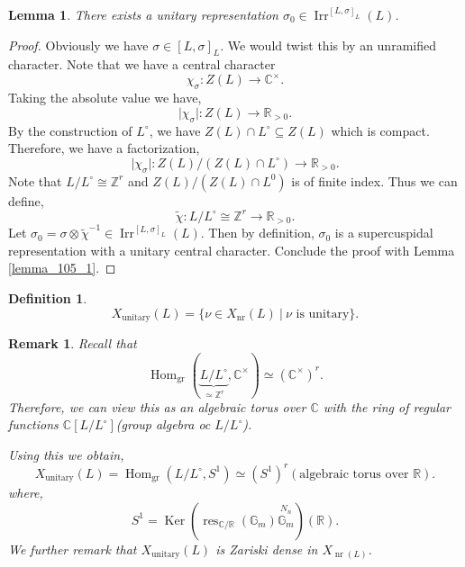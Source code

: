 \documentclass[8pt]{article}
\newtheorem{definition}{Definition}[section]
\newtheorem{lemma}{Lemma}[section]
\newtheorem{remark}{Remark}[section]
\DeclareMathOperator{\unitary}{unitary}
\DeclareMathOperator{\Hom}{Hom}
\DeclareMathOperator{\Ker}{Ker}
\DeclareMathOperator{\gr}{gr}
\DeclareMathOperator{\Irr}{Irr}
\DeclareMathOperator{\nr}{nr}
\DeclareMathOperator{\res}{res}
\newcommand{\R}[0]{\mathbb{R}}
\newcommand{\Z}[0]{\mathbb{Z}}
\newcommand{\C}[0]{\mathbb{C}}
\newcommand{\G}[0]{\mathbb{G}}
\newcommand{\sep}[0]{\:|\:}
\begin{document}
\begin{lemma}
  \label{lemma_105}
  There exists a unitary representation $\sigma_0\in\Irr^{[L,\sigma]_L}(L)$.
\end{lemma}
\begin{proof}
  Obviously we have $\sigma\in [L,\sigma]_L$. We would twist this by an unramified character. Note that we have a central character 
  \begin{equation*}
    \chi_{\sigma}:Z(L)\to\C^\times.
  \end{equation*}
  Taking the absolute value we have,
  \begin{equation*}
    \vert\chi_{\sigma}\vert:Z(L)\to\R_{>0}.
  \end{equation*}
  By the construction of $L^\circ$, we have $Z(L)\cap L^\circ\subseteq Z(L)$ which is compact. Therefore, we have a factorization,
  \begin{equation*}
    \vert \chi_{\sigma}\vert:Z(L)/(Z(L)\cap L^\circ)\to\R_{>0}.
  \end{equation*}
  Note that $L/L^\circ \cong \Z^r$ and $Z(L)/(Z(L)\cap L^0)$ is of finite index. Thus we can define,
  \begin{equation*}
    \widetilde{\chi}:L/L^\circ\cong\Z^r\to\R_{>0}.
  \end{equation*}
  Let $\sigma_0 = \sigma\otimes \widetilde{\chi}^{-1}\in\Irr^{[L,\sigma]_L}(L)$. Then by definition, $\sigma_0$ is a supercuspidal representation with a unitary central character.
  Conclude the proof with Lemma \ref{lemma_105_1}.
\end{proof}
\begin{definition}
  \begin{equation*}
    X_{\text{unitary}}(L) = \{\nu\in X_{\nr}(L)\sep \text{$\nu$ is unitary}\}.
  \end{equation*}
\end{definition}
\begin{remark}
  Recall that 
  \begin{equation*}
    \Hom_{\gr}(\underbrace{L/L^\circ}_{\simeq \Z^r},\C^\times)\simeq(\C^\times)^r.
  \end{equation*}
  Therefore, we can view this as an algebraic torus over $\C$ with the ring of regular functions $\C[L/L^\circ]$(group algebra oc $L/L^\circ$).
  \par Using this we obtain,
  \begin{equation*}
    X_{\text{unitary}}(L) = \Hom_{\gr}(L/L^\circ,S^1)\simeq (S^1)^r(\text{algebraic torus over $\R$}).
  \end{equation*}
  where, 
  \begin{equation*}
  S^1 = \Ker(\res_{\C/\R}(\G_m)\stackrel{N_n}{\G_m})(\R).
  \end{equation*}We further remark that $X_{\unitary}(L)$ is Zariski dense in $X_{\nr(L)}$.
\end{remark}
\end{document}
